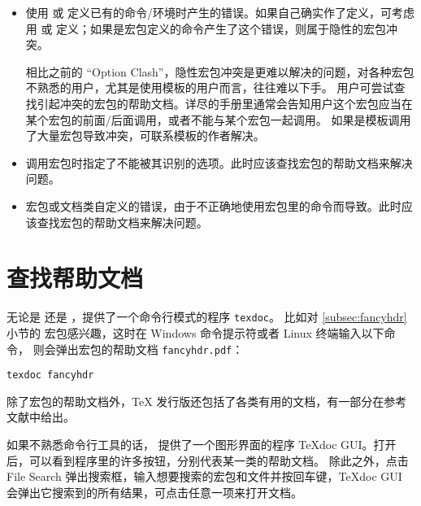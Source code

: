 \begin{itemize}
\item {}

使用  或  定义已有的命令/环境时产生的错误。如果自己确实作了定义，可考虑用
 或  定义；如果是宏包定义的命令产生了这个错误，则属于隐性的宏包冲突。

相比之前的 ``Option Clash''{}，隐性宏包冲突是更难以解决的问题，对各种宏包不熟悉的用户，尤其是使用模板的用户而言，往往难以下手。
用户可尝试查找引起冲突的宏包的帮助文档。详尽的手册里通常会告知用户这个宏包应当在某个宏包的前面/后面调用，或者不能与某个宏包一起调用。
如果是模板调用了大量宏包导致冲突，可联系模板的作者解决。

\item {}

调用宏包时指定了不能被其识别的选项。此时应该查找宏包的帮助文档来解决问题。

\item {}

宏包或文档类自定义的错误，由于不正确地使用宏包里的命令而导致。此时应该查找宏包的帮助文档来解决问题。

\end{itemize}

\section{查找帮助文档}\label{sec:texdoc}

无论是  还是 ，提供了一个命令行模式的程序 \texttt{texdoc}。
比如对 \ref{subsec:fancyhdr} 小节的  宏包感兴趣，这时在 Windows 命令提示符或者 Linux 终端输入以下命令，
则会弹出宏包的帮助文档 \texttt{fancyhdr.pdf}：
\begin{verbatim}
texdoc fancyhdr
\end{verbatim}

除了宏包的帮助文档外，\TeX{} 发行版还包括了各类有用的文档，有一部分在参考文献中给出。

如果不熟悉命令行工具的话， 提供了一个图形界面的程序 TeXdoc GUI。打开后，可以看到程序里的许多按钮，分别代表某一类的帮助文档。
除此之外，点击 File Search 弹出搜索框，输入想要搜索的宏包和文件并按回车键，TeXdoc GUI 会弹出它搜索到的所有结果，可点击任意一项来打开文档。


